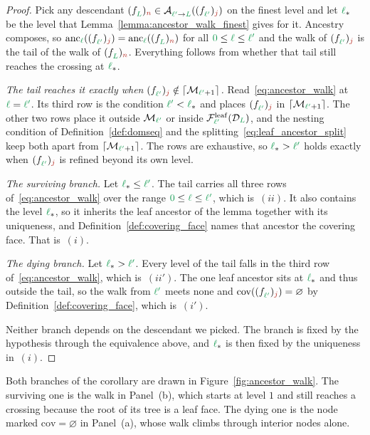 \documentclass[a4paper, 12pt]{article}
\makeatletter
\newcommand{\lstar}{\l_{\ast}}
\newcommand{\green}{\color{ForestGreen}}
\newcommand{\brickred}{\color{BrickRed}}
\newcommand{\F}{\mathcal{F}}
\newcommand{\face}[2]{\freeQ{f}{}{#1}{#2}}
\newcommand{\fineIdxone}{{\brickred j}}
\newcommand{\fineIdxtwo}{{\brickred n}}
\renewcommand{\l}{{\green\ell}}
\renewcommand{\L}{{\green L}}
\newcommand{\lzero}{{\green 0}}
\newcommand{\lone}{{\green {\l'}  }}
\newcommand{\freeQ}[4]{ ( {#1}^{#2}_{#3} )_{#4}}
\newcommand{\Aop}[3]{\mathcal{A}^{#1}_{{#2} \to {#3}}}
\newcommand{\M}{\mathcal{M}}
\theoremstyle{definition}
\theoremstyle{plain}
\numberwithin{equation}{section}
\newcommand{\ancestorPatch}[1]{\lceil #1 \rceil}
\DeclareRobustCommand{\domseq}[1][]{\mathcal{D}\ifx\@empty#1\@empty\else_{#1}\fi}
\newcommand{\leafF}[1]{\F^{\mathrm{leaf}}_{#1}}             %
\newcommand{\anc}[1]{\mathrm{anc}_{#1}}                     %
\newcommand{\coveringFace}{\mathrm{cov}}                    %
\makeatother
\begin{document}
\begin{proof}
    Pick any descendant $\face{\L}{\fineIdxtwo} \in \Aop{}{\lone}{\L}(\face{\lone}{\fineIdxone})$ on the finest level and let $\lstar$ be the level that Lemma~\ref{lemma:ancestor_walk_finest} gives for it. Ancestry composes, so $\anc{\l}(\face{\lone}{\fineIdxone}) = \anc{\l}(\face{\L}{\fineIdxtwo})$ for all $\lzero \leq \l \leq \lone$ and the walk of $\face{\lone}{\fineIdxone}$ is the tail of the walk of $\face{\L}{\fineIdxtwo}$. Everything follows from whether that tail still reaches the crossing at $\lstar$.

    \emph{The tail reaches it exactly when $\face{\lone}{\fineIdxone} \notin \ancestorPatch{\M_{\lone+1}}$.} Read~\eqref{eq:ancestor_walk} at $\l = \lone$. Its third row is the condition $\lone < \lstar$ and places $\face{\lone}{\fineIdxone}$ in $\ancestorPatch{\M_{\lone+1}}$. The other two rows place it outside $\M_\lone$ or inside $\leafF{\lone}(\domseq[\L])$, and the nesting condition of Definition~\ref{def:domseq} and the splitting~\eqref{eq:leaf_ancestor_split} keep both apart from $\ancestorPatch{\M_{\lone+1}}$. The rows are exhaustive, so $\lstar > \lone$ holds exactly when $\face{\lone}{\fineIdxone}$ is refined beyond its own level.

    \emph{The surviving branch.} Let $\lstar \leq \lone$. The tail carries all three rows of~\eqref{eq:ancestor_walk} over the range $\lzero \leq \l \leq \lone$, which is~$(ii)$. It also contains the level $\lstar$, so it inherits the leaf ancestor of the lemma together with its uniqueness, and Definition~\ref{def:covering_face} names that ancestor the covering face. That is~$(i)$.

    \emph{The dying branch.} Let $\lstar > \lone$. Every level of the tail falls in the third row of~\eqref{eq:ancestor_walk}, which is~$(ii')$. The one leaf ancestor sits at $\lstar$ and thus outside the tail, so the walk from $\lone$ meets none and $\coveringFace(\face{\lone}{\fineIdxone}) = \varnothing$ by Definition~\ref{def:covering_face}, which is~$(i')$.

    Neither branch depends on the descendant we picked. The branch is fixed by the hypothesis through the equivalence above, and $\lstar$ is then fixed by the uniqueness in~$(i)$.
\end{proof}

Both branches of the corollary are drawn in Figure~\ref{fig:ancestor_walk}. The surviving one is the walk in Panel~(b), which starts at level $1$ and still reaches a crossing because the root of its tree is a leaf face. The dying one is the node marked $\coveringFace = \varnothing$ in Panel~(a), whose walk climbs through interior nodes alone.
\end{document}
